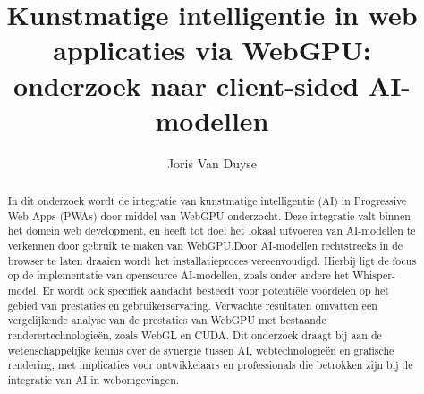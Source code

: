 \documentclass{hogent-article}
\title{Kunstmatige intelligentie in web applicaties via WebGPU: onderzoek naar client-sided AI-modellen}
\author{Joris Van Duyse}
\begin{document}
\begin{abstract}

In dit onderzoek wordt de integratie van kunstmatige intelligentie (AI) in Progressive Web Apps (PWAs) door middel van WebGPU onderzocht. Deze integratie valt binnen het domein web development, en heeft tot doel het lokaal uitvoeren van AI-modellen te verkennen door gebruik te maken van WebGPU.\@ Door AI-modellen rechtstreeks in de browser te laten draaien wordt het installatieproces vereenvoudigd. Hierbij ligt de focus op de implementatie van opensource AI-modellen, zoals onder andere het Whisper-model. Er wordt ook specifiek aandacht besteedt voor potentiële voordelen op het gebied van prestaties en gebruikerservaring. Verwachte resultaten omvatten een vergelijkende analyse van de prestaties van WebGPU met bestaande renderertechnologieën, zoals WebGL en CUDA. Dit onderzoek draagt bij aan de wetenschappelijke kennis over de synergie tussen AI, webtechnologieën en grafische rendering, met implicaties voor ontwikkelaars en professionals die betrokken zijn bij de integratie van AI in webomgevingen.
\end{abstract}

\tableofcontents



\printbibliography[heading=bibintoc]
\end{document}
